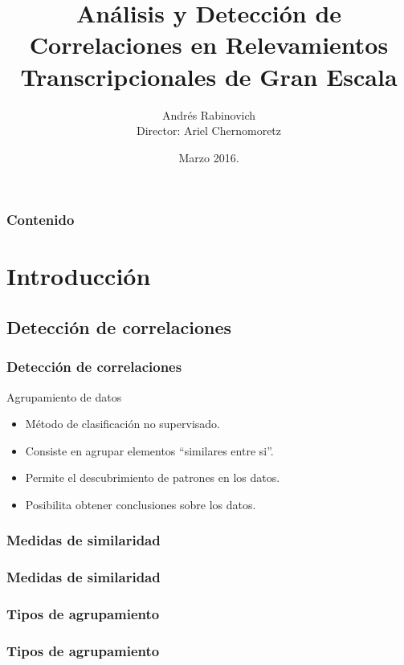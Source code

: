 \documentclass[serif,9pt, t]{beamer}
\newif\ifplacelogo %
\begin{document}
\title[Análisis y Detección de Correlaciones en Relevamien\ldots ]{Análisis y Detección de Correlaciones en Relevamientos Transcripcionales de Gran Escala}  
\author[Andrés Rabinovich]{Andrés Rabinovich\\{\small Director: Ariel Chernomoretz}}

\date{Marzo 2016.}


\begin{frame}
\titlepage
\end{frame}

\placelogofalse

\begin{frame}
\frametitle{Contenido}
\tableofcontents
\end{frame} 

\section{Introducción} 

\subsection{Detección de correlaciones}
\begin{frame}\frametitle{Detección de correlaciones} 
\Large Agrupamiento de datos\medskip
\normalsize
\begin{itemize}
\item Método de clasificación no supervisado.
\item Consiste en agrupar elementos ``similares entre si''.
\item Permite el descubrimiento de patrones en los datos.
\item Posibilita obtener conclusiones sobre los datos.
\end{itemize}

\end{frame}

\subsubsection*{Medidas de similaridad}
\begin{frame}
\frametitle{Medidas de similaridad} 
\end{frame}

\subsubsection*{Tipos de agrupamiento}
\begin{frame}
\frametitle{Tipos de agrupamiento} 
\end{frame}
\end{document}

